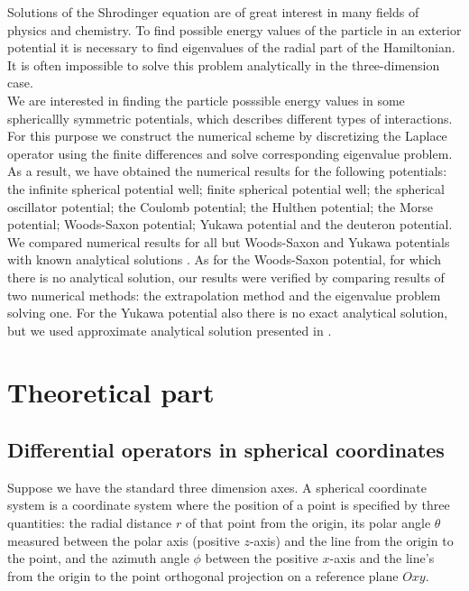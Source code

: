 \documentclass[a4paper, 12pt]{article}
\begin{document}
Solutions of the Shrodinger equation are of great interest in many fields of physics and chemistry.  To find possible energy values of the particle in an exterior potential it is necessary to find eigenvalues of the radial part of the Hamiltonian. It is often impossible to solve this problem analytically in the three-dimension case. \\
We are interested in finding the particle posssible energy values in some sphericallly symmetric potentials, which describes different types of interactions. For this purpose we construct the  numerical scheme by discretizing the Laplace  operator using the finite differences and solve corresponding eigenvalue problem.\\
As a result, we have obtained the numerical results for the following potentials:  the infinite spherical potential well; finite spherical potential well; the spherical oscillator potential; the Coulomb potential; the Hulthen potential; the Morse potential; Woods-Saxon potential; Yukawa potential and the deuteron potential. We compared numerical results for all but Woods-Saxon and Yukawa potentials with known analytical solutions \cite{flugge2012practical}. As for the Woods-Saxon potential, for which there is no analytical solution, our results were verified by comparing results of two numerical methods: the extrapolation method and the eigenvalue problem solving one. For the Yukawa potential also there is no exact analytical solution, but we used approximate analytical solution presented in \cite{hamzavi2012approximate}.




\section{Theoretical part}
\subsection{Differential operators in spherical coordinates}\label{dif_op_3d}
Suppose we have the standard three dimension axes. A spherical coordinate system is a coordinate system where the position of a point is specified by three quantities: the radial distance $r$ of that point from the origin, its polar angle $\theta$ measured between the polar axis (positive $z$-axis) and the line from the origin to the point, and the azimuth angle $\phi$ between the positive $x$-axis  and the line's from the origin to the point orthogonal projection on a reference plane $Oxy$.
\end{document}
